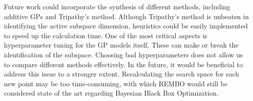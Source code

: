 Future work could incorporate the synthesis of different methods, including additive GPs and Tripathy's method.
Although Tripathy's method is unbeaten in identifying the active subspace dimension, heuristics could be easily implemented to speed up the calculation time.
One of the most critical aspects is hyperparameter tuning for the GP models itself.
These can make or break the identification of the subspace.
Choosing bad hyperparameters does not allow us to compare different methods effectively.
In the future, it would be beneficial to address this issue to a stronger extent.
Recalculating the search space for each new point may be too time-consuming, with which REMBO would still be considered state of the art regarding Bayesian Black Box Optimization.
 



